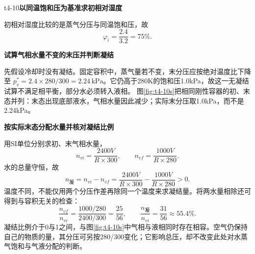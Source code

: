 \LectureAnswerSection

\begin{drillsolution}{t4-10}\textbf{以同温饱和压为基准求初相对湿度}\par\nobreak
初相对湿度比较的是蒸气分压与同温饱和压，故
\[\boxed{\varphi_i=\frac{2.4}{3.2}=75\%}.\]


\par\medskip{}\noindent\textbf{试算气相水量不变的末压并判断凝结}\par\nobreak
先假设冷却时没有凝结。固定容积中，蒸气量若不变，末分压应按绝对温度比下降至 $p_v^*=2.4\times280/300=2.24\,\mathrm{kPa}$。它仍高于280K的饱和压1.0kPa，故这一无凝结试算不满足相平衡，部分水必须转入液相。
图\ref{fig:t4-10s}把相同刚性容器的初、末态并列：末态出现底部液水，气相水量因此减少；实际末分压取1.0kPa，而不是2.24kPa。



\par\medskip{}\noindent\textbf{按实际末态分配水量并核对凝结比例}\par\nobreak
用SI单位分别求初、末气相水量，
\[n_{vi}=\frac{2400V}{R\times300},\qquad
\boxed{n_{vf}=\frac{1000V}{R\times280}}.\]
水的总量守恒，故
\[\boxed{n_{\text{凝}}=n_{vi}-n_{vf}
=\frac{2400V}{R\times300}-\frac{1000V}{R\times280}>0}.\]
温度不同，不能仅用两个分压作差再除同一个温度来求凝结量。将两水量相除还可得到与容积无关的检查：
\[
 \frac{n_{vf}}{n_{vi}}=\frac{1000/280}{2400/300}=\frac{25}{56},
 \qquad\frac{n_{\text{凝}}}{n_{vi}}=\frac{31}{56}\approx55.4\%.
\]
凝结比例介于0与1之间，与图\ref{fig:t4-10s}中气相与液相同时存在相容。空气仍保持自己的物质的量，其分压可另按280/300变化；它影响总压，却不改变此处对水蒸气饱和与气液分配的判断。
\end{drillsolution}
